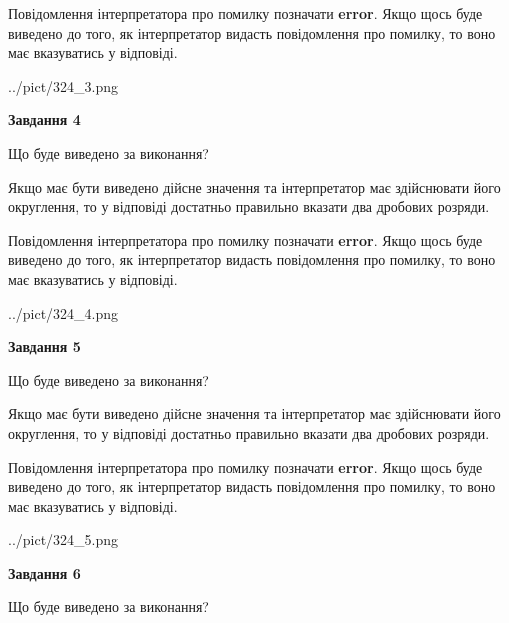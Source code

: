 \documentclass[12pt, ukrainian]{article}
\begin{document}
{\begin {Large}
Повідомлення інтерпретатора про помилку позначати \textbf{error}.
Якщо щось буде виведено до того, як інтерпретатор видасть повідомлення про помилку, 
то воно має вказуватись у відповіді. \par

\begin{center}
	{../pict/324_3.png}
\end{center}
\newpage

{\begin {center}\textbf{Завдання 4}\end {center}}\par
Що буде виведено за виконання? \par

Якщо має бути виведено дійсне значення та інтерпретатор має здійснювати його округлення, 
то у відповіді достатньо правильно вказати два дробових розряди.

Повідомлення інтерпретатора про помилку позначати \textbf{error}.
Якщо щось буде виведено до того, як інтерпретатор видасть повідомлення про помилку, 
то воно має вказуватись у відповіді. \par

\begin{center}
	{../pict/324_4.png}
\end{center}
\newpage

{\begin {center}\textbf{Завдання 5}\end {center}}\par
Що буде виведено за виконання? \par

Якщо має бути виведено дійсне значення та інтерпретатор має здійснювати його округлення, 
то у відповіді достатньо правильно вказати два дробових розряди.

Повідомлення інтерпретатора про помилку позначати \textbf{error}.
Якщо щось буде виведено до того, як інтерпретатор видасть повідомлення про помилку, 
то воно має вказуватись у відповіді. \par

\begin{center}
	{../pict/324_5.png}
\end{center}
\newpage

{\begin {center}\textbf{Завдання 6}\end {center}}\par
Що буде виведено за виконання? \par


\end{Large}}
\end{document}
